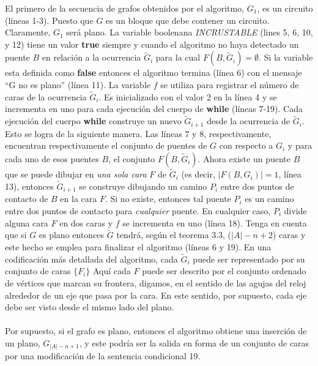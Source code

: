 \documentclass[10pt,a5paper]{book}
\begin{document}
El primero de la secuencia de grafos obtenidos por el algoritmo, $G_1$, es un circuito (líneas 1-3). Puesto que $G$ es un bloque que debe contener un circuito. Claramente, $G_1$ será plano. La variable boolenana \emph{INCRUSTABLE} (lines 5, 6, 10, y 12) tiene un valor \textbf{true} siempre y cuando el algoritmo no haya detectado un puente $B$ en relación a la ocurrencia $\widetilde{G}_i$ para la cual $F(B,\widetilde{G}_i) = \emptyset$. Si la variable esta definida como \textbf{false} entonces el algoritmo termina (línea 6) con el mensaje ``G no es plano'' (línea 11). La variable $f$ se utiliza para registrar el número de caras de la ocurrencia $\widetilde{G}_i$. Es inicializado con el valor 2 en la línea 4 y se incrementa en uno para cada ejecución del cuerpo de \textbf{while} (líneas 7-19). Cada ejecución del cuerpo \textbf{while} construye un nuevo $\widetilde{G}_{i+1}$ desde la ocurrencia de $\widetilde{G}_i$. Esto se logra de la siguiente manera. Las líneas 7 y 8, respectivamente, encuentran respectivamente el conjunto de puentes de $G$ con respecto a $G_i$ y para cada uno de esos puentes $B$, el conjunto $F(B,\widetilde{G}_i)$. Ahora existe un puente $B$ que se puede dibujar en \emph{una sola cara} $F$ de $\widetilde{G}_i$ (es decir, $|F(B,G_i)| = 1$, línea 13), entonces $\widetilde{G}_{i+1}$ se construye dibujando un camino $P_i$ entre dos puntos de contacto de $B$ en la cara $F$. Si no existe, entonces tal puente $P_i$ es un camino entre dos puntos de contacto para \emph{cualquier} puente. En cualquier caso, $P_i$ divide alguna cara $F$ en dos caras y $f$ se incrementa en uno (línea 18). Tenga en cuenta que si $G$ es plano entonces $\widetilde{G}$ tendrá, según el teorema 3.3, ($|A|-n+2$) caras y este hecho se emplea para finalizar el algoritmo (líneas 6 y 19). En una codificación más detallada del algoritmo, cada $\widetilde{G}_i$ puede ser representado por su conjunto de caras $\{F_i\}$ Aquí cada $F$ puede ser descrito por el conjunto ordenado de vértices que marcan su frontera, digamos, en el sentido de las agujas del reloj alrededor de un eje que pasa por la cara. En este sentido, por supuesto, cada eje debe ser visto desde el mismo lado del plano.
\hfill
\\
\\Por supuesto, si el grafo es plano, entonces el algoritmo obtiene una inserción de un plano, $G_{|A|-n+1}$, y este podría ser la salida en forma de un conjunto de caras por una modificación de la sentencia condicional 19.\\
\vfill
\nopagebreak
\end{document}
